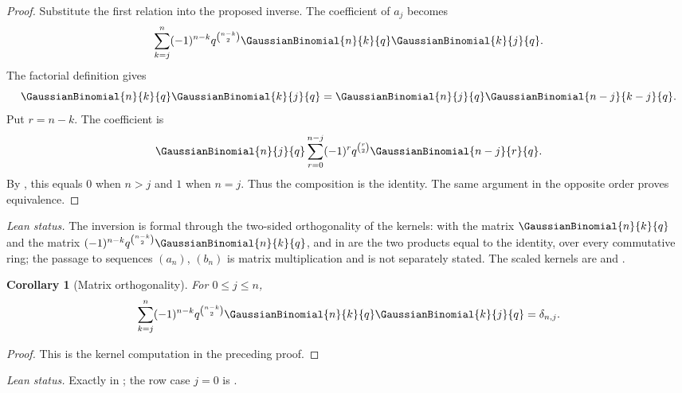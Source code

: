 \documentclass[11pt,a4paper,oneside,openany]{book}
\newtheorem{corollary}[corollary]{Corollary}
\theoremstyle{definition}
\theoremstyle{remark}
\begin{document}
\begin{proof}
Substitute the first relation into the proposed inverse.  The coefficient of $a_j$ becomes
\[
 \sum_{k=j}^{n}(-1)^{n-k}q^{\binom{n-k}{2}}
 \GaussianBinomial{n}{k}{q}\GaussianBinomial{k}{j}{q}.
\]
The factorial definition gives
\[
 \GaussianBinomial{n}{k}{q}\GaussianBinomial{k}{j}{q}=\GaussianBinomial{n}{j}{q}\GaussianBinomial{n-j}{k-j}{q}.
\]
Put $r=n-k$.  The coefficient is
\[
 \GaussianBinomial{n}{j}{q}
 \sum_{r=0}^{n-j}(-1)^rq^{\binom r2}\GaussianBinomial{n-j}{r}{q}.
\]
By , this equals $0$ when $n>j$ and $1$ when $n=j$.  Thus the composition is the identity.  The same argument in the opposite order proves equivalence.
\end{proof}

\emph{Lean status.}  The inversion is formal through the two-sided orthogonality of the
kernels: with  the matrix $\GaussianBinomial{n}{k}{q}$
and  the matrix
$(-1)^{n-k}q^{\binom{n-k}2}\GaussianBinomial{n}{k}{q}$,
 and
 in 
are the two products equal to the identity, over every commutative ring; the passage to
sequences $(a_n)$, $(b_n)$ is matrix multiplication and is not separately stated.  The
scaled kernels are  and
.


\begin{corollary}[Matrix orthogonality]\label{cor:qbinomial-orthogonality}
For $0\le j\le n$,
\[
 \sum_{k=j}^{n}(-1)^{n-k}q^{\binom{n-k}{2}}
 \GaussianBinomial{n}{k}{q}\GaussianBinomial{k}{j}{q}=\delta_{n,j}.
\]
\end{corollary}

\begin{proof}
This is the kernel computation in the preceding proof.
\end{proof}

\emph{Lean status.}  Exactly  in
; the row case $j=0$ is
.
\end{document}
